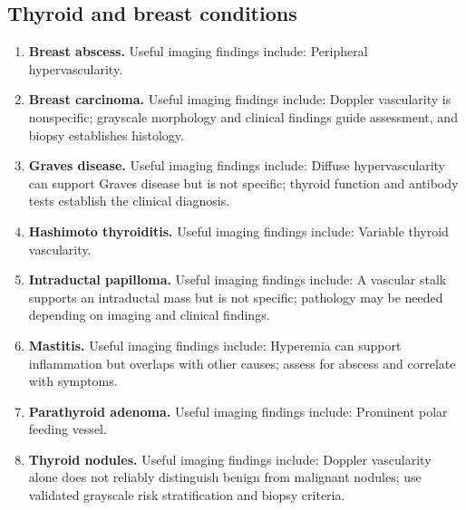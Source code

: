 \subsection{Thyroid and breast conditions}
\begin{enumerate}[leftmargin=*,itemsep=0.45em,topsep=0.4em]
\item \textbf{Breast abscess.} Useful imaging findings include: Peripheral hypervascularity.
\item \textbf{Breast carcinoma.} Useful imaging findings include: Doppler vascularity is nonspecific; grayscale morphology and clinical findings guide assessment, and biopsy establishes histology.
\item \textbf{Graves disease.} Useful imaging findings include: Diffuse hypervascularity can support Graves disease but is not specific; thyroid function and antibody tests establish the clinical diagnosis.
\item \textbf{Hashimoto thyroiditis.} Useful imaging findings include: Variable thyroid vascularity.
\item \textbf{Intraductal papilloma.} Useful imaging findings include: A vascular stalk supports an intraductal mass but is not specific; pathology may be needed depending on imaging and clinical findings.
\item \textbf{Mastitis.} Useful imaging findings include: Hyperemia can support inflammation but overlaps with other causes; assess for abscess and correlate with symptoms.
\item \textbf{Parathyroid adenoma.} Useful imaging findings include: Prominent polar feeding vessel.
\item \textbf{Thyroid nodules.} Useful imaging findings include: Doppler vascularity alone does not reliably distinguish benign from malignant nodules; use validated grayscale risk stratification and biopsy criteria.
\end{enumerate}

